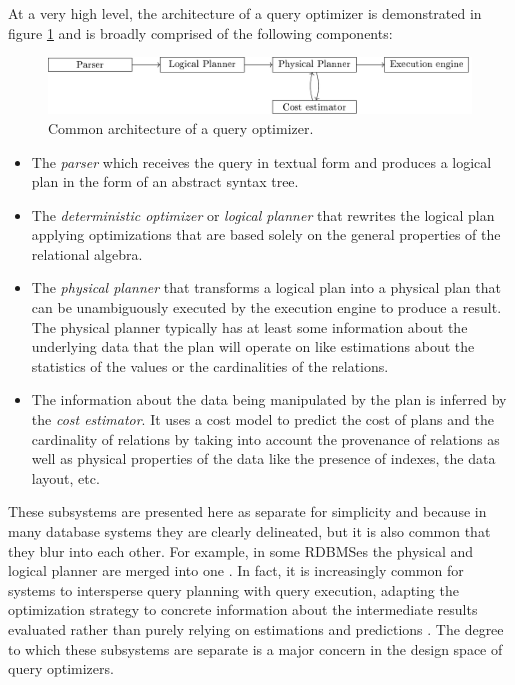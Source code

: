 At a very high level, the architecture of a query optimizer is
demonstrated in figure \ref{fig:optimizer_arch} and is broadly
comprised of the following components:

\begin{figure}[p]
\centering
\includegraphics[width=\textwidth]{./imgs/optimizer_architecture.pdf}
\caption{\label{fig:optimizer_arch}Common architecture of a query
  optimizer.}
\end{figure}

\begin{itemize}

\item The \emph{parser} which receives the query in textual form and
  produces a logical plan in the form of an abstract syntax tree.
\item The \emph{deterministic optimizer} or \emph{logical planner}
  that rewrites the logical plan applying optimizations that are based
  solely on the general properties of the relational algebra.
\item The \emph{physical planner} that transforms a logical plan into
  a physical plan that can be unambiguously executed by the execution
  engine to produce a result. The physical planner typically has at
  least some information about the underlying data that the plan will
  operate on like estimations about the statistics of the values or
  the cardinalities of the relations.
\item The information about the data being manipulated by the plan is
  inferred by the \emph{cost estimator}. It uses a cost model to
  predict the cost of plans and the cardinality of relations by taking
  into account the provenance of relations as well as physical
  properties of the data like the presence of indexes, the data layout,
  etc.
\end{itemize}

These subsystems are presented here as separate for simplicity and
because in many database systems they are clearly delineated, but it is
also common that they blur into each other. For example, in some RDBMSes
the physical and logical planner are merged into one
\cite{graefeCascadesFrameworkQuery1995,shankarQueryOptimizationMicrosoft2012,solimanOrcaModularQuery2014}. In
fact, it is increasingly common for systems to intersperse query
planning with query execution, adapting the optimization strategy
\cite{graefeDynamicQueryEvaluation1989} to concrete information about
the intermediate results evaluated rather than purely relying on
estimations and predictions
\cite{dingPlanStitchHarnessing2018,chaudhuriPayasyougoFrameworkQuery2008,wuSamplingbasedQueryReoptimization2016,herodotouXplusSqltuningawareQuery2010}. The
degree to which these subsystems are separate is a major concern in
the design space of query optimizers.

